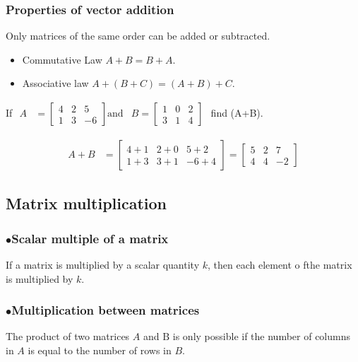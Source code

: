	 \subsubsection{Properties of vector addition}
	 Only matrices of the same order can be added or subtracted.
	 \begin{itemize}
	 	\item  Commutative Law \quad  $A+B=B+A$.
	 	\item Associative law \quad $A+(B+C)=(A+B)+C$.
	 \end{itemize}
	
	 \begin{exercise}
	 	If $\begin{aligned} A &=\left[\begin{array}{rrr}4 & 2 & 5 \\ 1 & 3 & -6\end{array}\right] \text{and} & B=\left[\begin{array}{lll}1 & 0 & 2 \\ 3 & 1 & 4\end{array}\right] \end{aligned}$ find (A+B).\end{exercise}
 	\begin{answer}
 			$$\begin{aligned}
 			A+B &=\left[\begin{array}{lrl}4+1 & 2+0 & 5+2 \\ 1+3 & 3+1 & -6+4\end{array}\right]=\left[\begin{array}{lll}5 & 2 & 7 \\ 4 & 4 & -2\end{array}\right] \end{aligned}$$
 	\end{answer}
	 
	 
	 \subsection{Matrix multiplication}
	 \subsubsection{$\bullet$Scalar multiple of a matrix}
	 If a matrix is multiplied by a scalar quantity $k$, then each element o fthe matrix is multiplied by $k$.
	 \subsubsection{$\bullet$Multiplication between matrices}
	The product of two matrices $A$ and $\mathrm{B}$ is only possible if the number of columns in $A$ is equal to the number of rows in $B$.
	 
